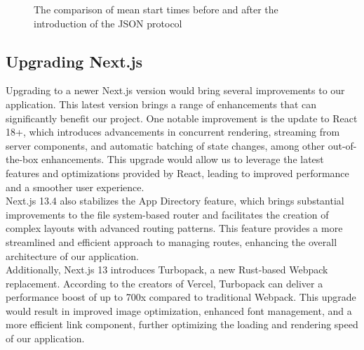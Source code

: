 \begin{figure}[h]
\centering
{}
\caption[Prisma cold start mean time]{The comparison of mean start times before and after the introduction of the JSON protocol}
\label{figure:prisma_before_after}
\end{figure}


\subsection{Upgrading Next.js}

Upgrading to a newer Next.js version would bring several improvements to our application. This latest version brings a range of enhancements that can significantly benefit our project. One notable improvement is the update to React 18+, which introduces advancements in concurrent rendering, streaming from server components, and automatic batching of state changes, among other out-of-the-box enhancements. \cite{react_blog_reactv18} This upgrade would allow us to leverage the latest features and optimizations provided by React, leading to improved performance and a smoother user experience. \\

\noindent
Next.js 13.4 also stabilizes the App Directory feature, which brings substantial improvements to the file system-based router and facilitates the creation of complex layouts with advanced routing patterns. \cite{nextjs_blog_next13} This feature provides a more streamlined and efficient approach to managing routes, enhancing the overall architecture of our application. \\

\noindent
Additionally, Next.js 13 introduces Turbopack, a new Rust-based Webpack replacement. According to the creators of Vercel, Turbopack can deliver a performance boost of up to 700x compared to traditional Webpack. \cite{nextjs_turbopack} This upgrade would result in improved image optimization, enhanced font management, and a more efficient link component, further optimizing the loading and rendering speed of our application. \\

